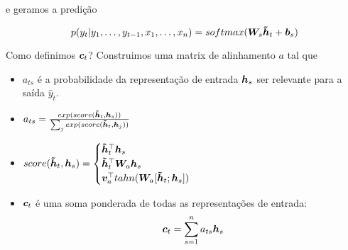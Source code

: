 e geramos a predição

\begin{equation}
p(y_t | y_1, \dots, y_{t-1}, x_1, \dots, x_{n}) = softmax(\bm{W}_{s}  \bm{\tilde{h}}_t + \bm{b}_s)
\end{equation}


Como definimos $\bm{c}_t$? Construimos uma matrix de alinhamento $a$ tal que

\begin{itemize}
\item $a_{ts}$ é a probabilidade da representação de entrada $\bm{h}_s$ ser relevante para a saída $\hat{y}_t$.
\item $a_{ts} = \frac{exp(score(\bm{\tilde{h}}_t,\bm{h}_s))}{\sum_j exp(score(\bm{\tilde{h}}_t,\bm{h}_j))}$ 
\item $score(\bm{\tilde{h}}_t,\bm{h}_s) = \begin{cases}
\bm{\tilde{h}}_t ^{\top}\bm{h}_s\\
\bm{\tilde{h}}_t ^{\top}\bm{W}_a \bm{h}_s\\
\bm{v}_a ^{\top}tahn(\bm{W}_a[\bm{\tilde{h}}_t;\bm{h}_s])\\
\end{cases}$ 
\item $\bm{c}_t$ é uma soma ponderada de todas as representações de entrada: 
\begin{equation}
\bm{c}_t = \sum_{s=1}^{n} a_{ts}\bm{h}_s
\end{equation}
\end{itemize}
